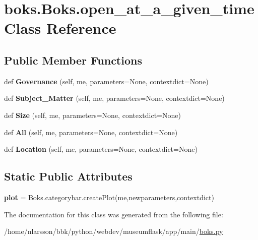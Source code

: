 \hypertarget{classboks_1_1Boks_1_1open__at__a__given__time}{}\section{boks.\+Boks.\+open\+\_\+at\+\_\+a\+\_\+given\+\_\+time Class Reference}
\label{classboks_1_1Boks_1_1open__at__a__given__time}
\subsection*{Public Member Functions}
\begin{DoxyCompactItemize}
\item 
\mbox{\label{classboks_1_1Boks_1_1open__at__a__given__time_af03179ae15c03e8e4fbe6385c29f352f}} 
def {\bfseries Governance} (self, me, parameters=None, contextdict=None)
\item 
\mbox{\label{classboks_1_1Boks_1_1open__at__a__given__time_affd2e8fb2e0bdde80d4c351e36ab3acd}} 
def {\bfseries Subject\+\_\+\+Matter} (self, me, parameters=None, contextdict=None)
\item 
\mbox{\label{classboks_1_1Boks_1_1open__at__a__given__time_a11b89c4a438ef76d50cad4e4709a732c}} 
def {\bfseries Size} (self, me, parameters=None, contextdict=None)
\item 
\mbox{\label{classboks_1_1Boks_1_1open__at__a__given__time_a5c1f4a0054782376571ca9af0ac3626f}} 
def {\bfseries All} (self, me, parameters=None, contextdict=None)
\item 
\mbox{\label{classboks_1_1Boks_1_1open__at__a__given__time_a55b614869178c9ee22f487aef846712e}} 
def {\bfseries Location} (self, me, parameters=None, contextdict=None)
\end{DoxyCompactItemize}
\subsection*{Static Public Attributes}
\begin{DoxyCompactItemize}
\item 
\mbox{\label{classboks_1_1Boks_1_1open__at__a__given__time_ab2a8dc59bca553c4d2863ea115f0b370}} 
{\bfseries plot} = Boks.\+categorybar.\+create\+Plot(me,newparameters,contextdict)
\end{DoxyCompactItemize}


The documentation for this class was generated from the following file\+:\begin{DoxyCompactItemize}
\item 
/home/nlarsson/bbk/python/webdev/museumflask/app/main/\mbox{\hyperlink{boks_8py}{boks.\+py}}\end{DoxyCompactItemize}
